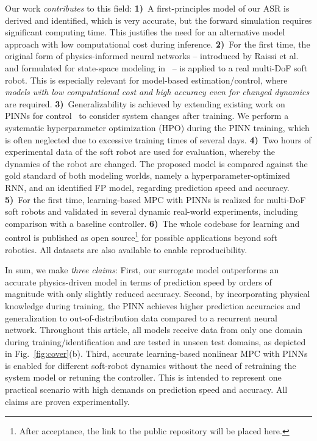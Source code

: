 Our work \textit{contributes} to this field: 
\textbf{1)}~A first-principles model of our ASR is derived and identified, which is very accurate, but the forward simulation requires significant computing time. 
This justifies the need for an alternative model approach with low computational cost during inference.
\textbf{2)}~For the first time, the original form of physics-informed neural networks -- introduced by Raissi et al.~\cite{Raissi.2019} and formulated for state-space modeling in~\cite{Antonelo.2024,Krauss.2024} -- is applied to a real multi-DoF soft robot.
This is especially relevant for model-based estimation/control, where \textit{models with low computational cost and high accuracy even for changed dynamics} are required.
\textbf{3)}~Generalizability is achieved by extending existing work on PINNs for control~\cite{Antonelo.2024,Krauss.2024} to consider system changes after training.
We perform a systematic hyperparameter optimization (HPO) during the PINN training, which is often neglected due to excessive training times of several days.
\textbf{4)}~Two hours of experimental data of the soft robot are used for evaluation, whereby the dynamics of the robot are changed. 
The proposed model is compared against the gold standard of both modeling worlds, namely a hyperparameter-optimized RNN, and an identified FP model, regarding prediction speed and accuracy.
\textbf{5)}~For the first time, learning-based MPC with PINNs is realized for multi-DoF soft robots and validated in several dynamic real-world experiments, including comparison with a baseline controller.
\textbf{6)}~The whole codebase for learning and control is published as open source\footnote{\label{foot:pinn}After acceptance, the link to the public repository will be placed here.} for possible applications beyond soft robotics. 
All datasets are also available to enable reproducibility.

In sum, we make \textit{three claims}: 
First, our surrogate model outperforms an accurate physics-driven model in terms of prediction speed by orders of magnitude with only slightly reduced accuracy.
Second, by incorporating physical knowledge during training, the PINN achieves higher prediction accuracies and generalization to out-of-distribution data compared to a recurrent neural network.
Throughout this article, all models receive data from only one domain during training/identification and are tested in unseen test domains, as depicted in Fig.~\ref{fig:cover}(b).
Third, accurate learning-based nonlinear MPC with PINNs is enabled for different soft-robot dynamics without the need of retraining the system model or retuning the controller.
This is intended to represent one practical scenario with high demands on prediction speed and accuracy. 
All claims are proven experimentally.